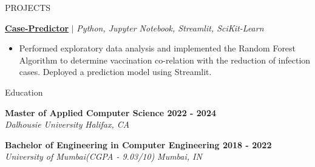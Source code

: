\documentclass{resume} %
\begin{document}
\begin{rSection}{PROJECTS}

\href{https://github.com/RutvikJ77/Case-Predictor}{\textbf{\underline{Case-Predictor}}} $|$\textit{ Python, Jupyter Notebook, Streamlit, SciKit-Learn}
\begin{itemize}
    \item  Performed exploratory data analysis and implemented the Random Forest Algorithm to determine vaccination co-relation with the reduction of infection cases. Deployed a prediction model using Streamlit.
\end{itemize}


\end{rSection} 


\begin{rSection}{Education}

{\bf Master of Applied Computer Science \hfill {2022 - 2024}}\\
\textit{Dalhousie University} \hfill{\textit{Halifax, CA}}

{\bf Bachelor of Engineering in Computer Engineering \hfill {2018 - 2022}}\\
\textit{University of Mumbai(CGPA - 9.03/10)} \hfill{\textit{Mumbai, IN}}


\end{rSection}
\end{document}
